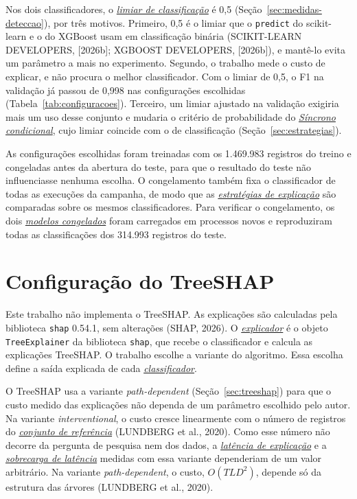 \documentclass[
  12pt,
  oneside,
  a4paper,
  chapter=TITLE,
  sumario=tradicional,
  english,
  brazil
]{abntex2}
\newcommand{\termo}[2]{\hyperref[gl:#1]{\emph{#2}}}
\begin{document}
Nos dois classificadores, o \termo{limiar-classificacao}{limiar de classificação} é 0,5
(Seção~\ref{sec:medidas-deteccao}), por três motivos. Primeiro, 0,5 é o limiar que o
\texttt{predict} do scikit-learn e o do XGBoost usam em classificação binária (SCIKIT-LEARN DEVELOPERS, [2026b]; XGBOOST DEVELOPERS, [2026b]),
e mantê-lo evita um parâmetro a mais no experimento.
Segundo, o trabalho mede o custo de explicar, e não procura o melhor classificador. Com o limiar de
0,5, o F1 na validação já passou de 0,998 nas configurações escolhidas
(Tabela~\ref{tab:configuracoes}). Terceiro, um limiar ajustado na validação exigiria mais um uso
desse conjunto e mudaria o critério de probabilidade do \termo{sincrono-condicional}{Síncrono
condicional}, cujo limiar coincide com o de classificação (Seção~\ref{sec:estrategias}).

As configurações escolhidas foram treinadas com os 1.469.983 registros do treino e congeladas antes
da abertura do teste, para que o resultado do teste não influenciasse nenhuma escolha. O
congelamento também fixa o classificador de todas as execuções da campanha, de modo que as
\termo{estrategia}{estratégias de explicação} são comparadas sobre os mesmos classificadores. Para verificar o
congelamento, os dois \termo{modelo-congelado}{modelos congelados} foram carregados em processos
novos e reproduziram todas as classificações dos 314.993 registros do teste.

\section{Configuração do TreeSHAP}
\label{sec:explicacoes}

Este trabalho não implementa o TreeSHAP. As explicações são calculadas pela biblioteca
\texttt{shap} 0.54.1, sem alterações (SHAP, 2026). O \termo{explicador}{explicador} é o objeto
\texttt{TreeExplainer} da biblioteca \texttt{shap}, que recebe o classificador e calcula as
explicações TreeSHAP. O trabalho escolhe a variante do algoritmo. Essa
escolha define a saída explicada de cada \termo{classificador}{classificador}.

O TreeSHAP usa a variante \emph{path-dependent} (Seção~\ref{sec:treeshap}) para que o custo medido das explicações não dependa de um parâmetro escolhido
pelo autor. Na variante \emph{interventional}, o custo cresce linearmente com o número de registros
do \termo{conjunto-referencia}{conjunto de referência} (LUNDBERG et al., 2020). Como esse número não
decorre da pergunta de pesquisa nem dos dados, a \termo{latencia-explicacao}{latência de explicação}
e a \termo{sobrecarga}{sobrecarga de latência} medidas com essa variante dependeriam de um valor
arbitrário. Na variante \emph{path-dependent}, o custo, $O(TLD^2)$, depende só da estrutura das
árvores (LUNDBERG et al., 2020).
\end{document}
